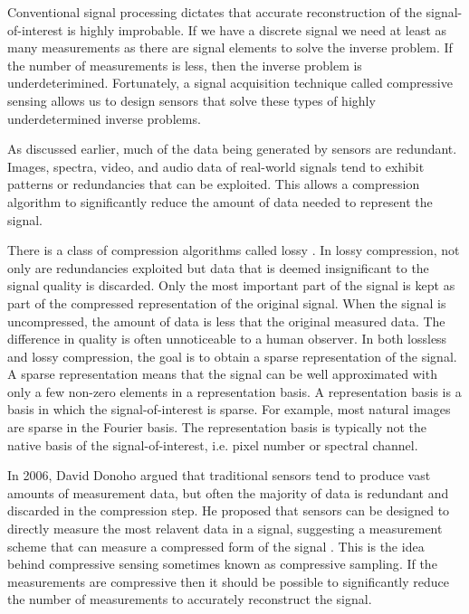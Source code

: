 Conventional signal processing dictates that accurate reconstruction of the signal-of-interest is highly improbable. If we have a discrete signal we need at least as many measurements as there are signal elements to solve the inverse problem. If the number of measurements is less, then the inverse problem is underdeterimined. Fortunately, a signal acquisition technique called \gls{compressive sensing} allows us to design sensors that solve these types of highly underdetermined inverse problems.

As discussed earlier, much of the data being generated by sensors are redundant. Images, spectra, video, and audio data of real-world signals tend to exhibit patterns or redundancies that can be exploited. This allows a compression algorithm to significantly reduce the amount of data needed to represent the signal. 

There is a class of compression algorithms called lossy \cite{usevitch2001tutorial}. In lossy compression, not only are redundancies exploited but data that is deemed insignificant to the signal quality is discarded. Only the most important part of the signal is kept as part of the compressed representation of the original signal. When the signal is uncompressed, the amount of data is less that the original measured data. The difference in quality is often unnoticeable to a human observer. In both lossless and lossy compression, the goal is to obtain a \gls{sparse} representation of the signal. A sparse representation means that the signal can be well approximated with only a few non-zero elements in a representation basis. A representation basis is a basis in which the signal-of-interest is sparse. For example, most natural images are sparse in the Fourier basis. The representation basis is typically not the native basis of the signal-of-interest, i.e. pixel number or spectral channel.

In 2006, David Donoho argued that traditional sensors tend to produce vast amounts of measurement data, but often the majority of data is redundant and discarded in the compression step. He proposed that sensors can be designed to directly measure the most relavent data in a signal, suggesting a measurement scheme that can measure a compressed form of the signal \cite{donoho2006compressed}. This is the idea behind \gls{compressive sensing} sometimes known as \gls{compressive sampling}. If the measurements are compressive then it should be possible to significantly reduce the number of measurements to accurately reconstruct the signal. 

